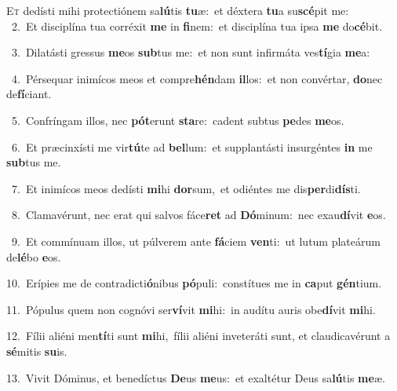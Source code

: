\lettrine{\initial\textcolor{\initialcolor}{E}}{t} dedísti mihi protectiónem sa\-\textbf{lú}\-tis \textbf{tu}\-æ:~\star et déxtera \textbf{tu}\-a su\-\textbf{scé}\-pit me:\\
{\numbfont\textcolor{\numbcolor}{~2.}}~Et disciplína tua corréxit \textbf{me} in \textbf{fi}\-nem:~\star et disciplína tua ipsa \textbf{me} do\-\textbf{cé}\-bit.\par
{\numbfont\textcolor{\numbcolor}{~3.}}~Dilatásti gressus \textbf{me}\-os \textbf{sub}\-tus me:~\star et non sunt infirmáta ves\-\textbf{tí}\-gia \textbf{me}\-a:\par
{\numbfont\textcolor{\numbcolor}{~4.}}~Pérsequar inimícos meos et compre\-\textbf{hén}\-dam \textbf{il}\-los:~\star et non convértar, \textbf{do}\-nec de\-\textbf{fí}\-ciant.\par
{\numbfont\textcolor{\numbcolor}{~5.}}~Confríngam illos, nec \textbf{pót}\-erunt \textbf{sta}\-re:~\star cadent subtus \textbf{pe}\-des \textbf{me}\-os.\par
{\numbfont\textcolor{\numbcolor}{~6.}}~Et præcinxísti me vir\-\textbf{tú}\-te ad \textbf{bel}\-lum:~\star et supplantásti insurgéntes \textbf{in} me \textbf{sub}\-tus me.\par
{\numbfont\textcolor{\numbcolor}{~7.}}~Et inimícos meos dedísti \textbf{mi}\-hi \textbf{dor}\-sum,~\star et odiéntes me dis\-\textbf{per}\-di\-\textbf{dís}\-ti.\par
{\numbfont\textcolor{\numbcolor}{~8.}}~Clamavérunt, nec erat qui salvos fáce\textbf{ret} ad \textbf{Dó}\-minum:~\star nec exau\-\textbf{dí}\-vit \textbf{e}\-os.\par
{\numbfont\textcolor{\numbcolor}{~9.}}~Et commínuam illos, ut púlverem ante \textbf{fá}\-ciem \textbf{ven}\-ti:~\star ut lutum plateárum de\-\textbf{lé}\-bo \textbf{e}\-os.\par
{\numbfont\textcolor{\numbcolor}{10.}}~Erípies me de contradicti\-\textbf{ó}\-nibus \textbf{pó}\-puli:~\star constítues me in \textbf{ca}\-put \textbf{gén}\-tium.\par
{\numbfont\textcolor{\numbcolor}{11.}}~Pópulus quem non cognóvi ser\-\textbf{ví}\-vit \textbf{mi}\-hi:~\star in audítu auris obe\-\textbf{dí}\-vit \textbf{mi}\-hi.\par
{\numbfont\textcolor{\numbcolor}{12.}}~Fílii aliéni men\-\textbf{tí}\-ti sunt \textbf{mi}\-hi,~\star fílii aliéni inveteráti sunt, et claudicavérunt a \textbf{sé}\-mitis \textbf{su}\-is.\par
{\numbfont\textcolor{\numbcolor}{13.}}~Vivit Dóminus, et benedíctus \textbf{De}\-us \textbf{me}\-us:~\star et exaltétur Deus sa\-\textbf{lú}\-tis \textbf{me}\-æ.\par
